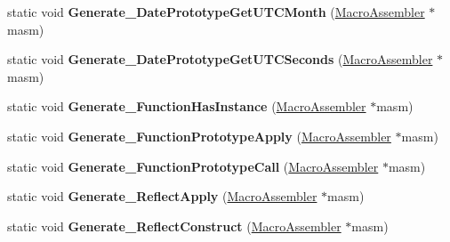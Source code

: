 \begin{DoxyCompactItemize}
\item 
static void {\bfseries Generate\+\_\+\+Date\+Prototype\+Get\+U\+T\+C\+Month} (\hyperlink{classv8_1_1internal_1_1_macro_assembler}{Macro\+Assembler} $\ast$masm)\hypertarget{classv8_1_1internal_1_1_builtins_a5dbb74e5bbc812aa87a6d8370b3206a8}{}\label{classv8_1_1internal_1_1_builtins_a5dbb74e5bbc812aa87a6d8370b3206a8}

\item 
static void {\bfseries Generate\+\_\+\+Date\+Prototype\+Get\+U\+T\+C\+Seconds} (\hyperlink{classv8_1_1internal_1_1_macro_assembler}{Macro\+Assembler} $\ast$masm)\hypertarget{classv8_1_1internal_1_1_builtins_a645216e58d0379e9405940c3b7374ce3}{}\label{classv8_1_1internal_1_1_builtins_a645216e58d0379e9405940c3b7374ce3}

\item 
static void {\bfseries Generate\+\_\+\+Function\+Has\+Instance} (\hyperlink{classv8_1_1internal_1_1_macro_assembler}{Macro\+Assembler} $\ast$masm)\hypertarget{classv8_1_1internal_1_1_builtins_ab1e09cfc1fdd3a33fa623a969bd1d7d7}{}\label{classv8_1_1internal_1_1_builtins_ab1e09cfc1fdd3a33fa623a969bd1d7d7}

\item 
static void {\bfseries Generate\+\_\+\+Function\+Prototype\+Apply} (\hyperlink{classv8_1_1internal_1_1_macro_assembler}{Macro\+Assembler} $\ast$masm)\hypertarget{classv8_1_1internal_1_1_builtins_a638b3349cd884252536d65f9f5b13719}{}\label{classv8_1_1internal_1_1_builtins_a638b3349cd884252536d65f9f5b13719}

\item 
static void {\bfseries Generate\+\_\+\+Function\+Prototype\+Call} (\hyperlink{classv8_1_1internal_1_1_macro_assembler}{Macro\+Assembler} $\ast$masm)\hypertarget{classv8_1_1internal_1_1_builtins_adee9bdb8a4c4fc63f7d577bc84105bfa}{}\label{classv8_1_1internal_1_1_builtins_adee9bdb8a4c4fc63f7d577bc84105bfa}

\item 
static void {\bfseries Generate\+\_\+\+Reflect\+Apply} (\hyperlink{classv8_1_1internal_1_1_macro_assembler}{Macro\+Assembler} $\ast$masm)\hypertarget{classv8_1_1internal_1_1_builtins_ad8803c94ea3c82b713638c2de00b1769}{}\label{classv8_1_1internal_1_1_builtins_ad8803c94ea3c82b713638c2de00b1769}

\item 
static void {\bfseries Generate\+\_\+\+Reflect\+Construct} (\hyperlink{classv8_1_1internal_1_1_macro_assembler}{Macro\+Assembler} $\ast$masm)\hypertarget{classv8_1_1internal_1_1_builtins_abe6a1c0e43b5cfc7626193c68f28652c}{}\label{classv8_1_1internal_1_1_builtins_abe6a1c0e43b5cfc7626193c68f28652c}


\end{DoxyCompactItemize}
